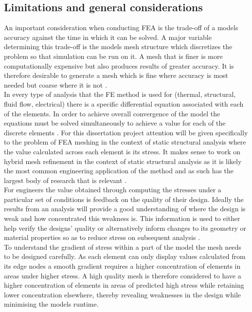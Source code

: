 \subsection{Limitations and general considerations}
\noindent
An important consideration when conducting FEA is the trade-off of a models accuracy against the time in which it can be solved. A major variable determining this trade-off is the models mesh structure which discretizes the problem so that simulation can be run on it. A mesh that is finer is more computationally expensive but also produces results of greater accuracy. It is therefore desirable to generate a mesh which is fine where accuracy is most needed but coarse where it is not \cite{cite04}. \\

\noindent
In every type of analysis that the FE method is used for (thermal, structural, fluid flow, electrical) there is a specific differential equation associated with each of the elements. In order to achieve overall convergence of the model the equations must be solved simultaneously to achieve a value for each of the discrete elements \cite{IntroductionToFE}. For this dissertation project attention will be given specifically to the problem of FEA meshing in the context of static structural analysis where the value calculated across each element is its stress. It makes sense to work on hybrid mesh refinement in the context of static structural analysis as it is likely the most common engineering application of the method and as such has the largest body of research that is relevant \cite{DolsakPaper94}\cite{IntroductionToFE}.\\

\noindent
For engineers the value obtained through computing the stresses under a particular set of conditions is feedback on the quality of their design. Ideally the results from an analysis will provide a good understanding of where the design is weak and how concentrated this weakness is. This information is used to either help verify the designs' quality or alternatively inform changes to its geometry or material properties so as to reduce stress on subsequent analysis \cite{cite06}.\\

\noindent
To understand the gradient of stress within a part of the model the mesh needs to be designed carefully. As each element can only display values calculated from its edge nodes a smooth gradient requires a higher concentration of elements in areas under higher stress. A high quality mesh is therefore considered to have a higher concentration of elements in areas of predicted high stress while retaining lower concentration elsewhere, thereby revealing weaknesses in the design while minimising the models runtime.\\

